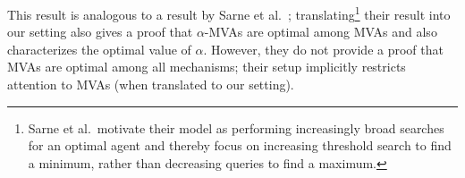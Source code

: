 



This result is analogous to a result by Sarne et
al.~\cite{SarneSR2010:IncreasingSearch}; translating\footnote{Sarne et
  al.~motivate their model as performing increasingly broad searches for an
  optimal agent and thereby focus on increasing threshold search to find a
  minimum, rather than decreasing queries to find a maximum.}
 their result into our
setting also gives a proof that $\alpha$-MVAs are optimal
among MVAs and also characterizes the optimal value of $\alpha$.  However, they do
not provide a proof that MVAs are optimal among all mechanisms; their setup
implicitly restricts attention to MVAs (when translated to our setting).


